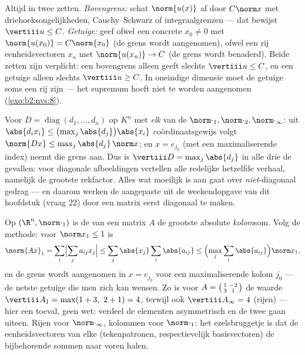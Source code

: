 \begin{method}\label{met:b2:nvs:opnorm}
Altijd in twee zetten. \emph{Bovengrens:} schat $\norm{u(x)}$ af
door $C\norm x$ met driehoeksongelijkheden, Cauchy--Schwarz of
integraalgrenzen --- dat bewijst $\vertiii u \leq C$.
\emph{Getuige:} geef ofwel een concrete $x_0 \neq 0$ met
$\norm{u(x_0)} = C\norm{x_0}$ (de grens wordt aangenomen), ofwel
een rij eenheidsvectoren $x_n$ met $\norm{u(x_n)} \to C$ (de grens
wordt benaderd). Beide zetten zijn verplicht: een bovengrens alleen
geeft slechts $\vertiii u \leq C$, en een getuige alleen slechts
$\vertiii u \geq C$. In oneindige dimensie moet de getuige soms een
rij zijn --- het supremum hoeft niet te worden aangenomen
(\cref{exo:b2:nvs:8}).
\end{method}

\begin{example}\label{ex:b2:nvs:diagonalnorm}
Voor $D = \operatorname{diag}(d_1, \dots, d_n)$ op $K^n$ met
\emph{elk} van de  $\norm\cdot_1, \norm\cdot_2,
\norm\cdot_\infty$: uit $\abs{d_ix_i} \leq
\bigl(\max_j\abs{d_j}\bigr)\abs{x_i}$ coördinaatsgewijs volgt
$\norm{Dx} \leq \max_j\abs{d_j}\,\norm x$; en $x = e_{j_0}$ (met
een maximaliserende index) neemt die grens aan. Dus is $\vertiii D
= \max_j\abs{d_j}$ in alle drie de gevallen: voor diagonale
afbeeldingen vertellen alle redelijke  hetzelfde verhaal,
namelijk de grootste rekfactor. Alles wat moeilijk is aan
 gaat over \emph{niet}-diagonaal gedrag --- en
daarom werken de aangepaste  uit de weekendopgave van dit
hoofdstuk (vraag 22) door een matrix eerst diagonaal te maken.
\end{example}

\begin{example}\label{ex:b2:nvs:columnsums}
Op $(\R^n, \norm\cdot_1)$ is de  van een matrix $A$ de
grootste absolute \emph{kolom}som. Volg de methode: voor $\norm x_1
\leq 1$ is
\[
\norm{Ax}_1 = \sum_i\Bigl|\sum_j a_{ij}x_j\Bigr|
\leq \sum_j \abs{x_j}\sum_i\abs{a_{ij}}
\leq \Bigl(\max_j\sum_i\abs{a_{ij}}\Bigr)\norm x_1 ,
\]
en de grens wordt aangenomen in $x = e_{j_0}$ voor een
maximaliserende kolom $j_0$ --- de netste getuige die men zich kan
wensen. Zo is voor $A = \begin{psmallmatrix}1 & -2\\ 3 &
1\end{psmallmatrix}$ de waarde $\vertiii A_1 = \max(1 + 3,\ 2 + 1)
= 4$, terwijl ook $\vertiii A_\infty = 4$ (rijen) --- hier een
toeval, geen wet: verdeel de elementen asymmetrisch en de twee
 gaan uiteen. Rijen voor $\norm\cdot_\infty$, kolommen voor
$\norm\cdot_1$: het ezelsbruggetje is dat de eenheidsvectoren van
elke  (tekenpatronen, respectievelijk basisvectoren) de
bijbehorende sommen naar voren halen.
\end{example}


